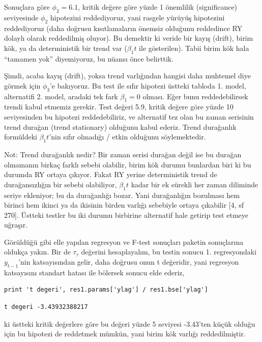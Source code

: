 \documentclass[12pt,fleqn]{article}\usepackage{../../common}
\begin{document}
Sonuçlara göre $\phi_2 = 6.1$, kritik değere göre yüzde 1 önemlilik
(significance) seviyesinde $\phi_2$ hipotezini reddediyoruz, yani rasgele
yürüyüş hipotezini reddediyoruz (daha doğrusu kısıtlamaların önemsiz
olduğunu reddedince RY dolaylı olarak reddedilmiş oluyor). Bu demektir ki
veride bir kayış (drift), birim kök, ya da deterministik bir trend var
($\beta_1 t$ ile gösterilen). Tabii birim kök hala ``tamamen yok'' diyemiyoruz,
bu nüansı önce belirttik.

Şimdi, acaba kayış (drift), yoksa trend varlığından hangisi daha muhtemel
diye görmek için $\phi_3$'e bakıyoruz. Bu test ile sıfır hipotezi üstteki
tabloda 1. model, alternatifi 2. model, aradaki tek fark $\beta_1=0$
olması. Eğer bunu reddedebilirsek trendi kabul etmemiz gerekir. Test değeri
5.9, kritik değere göre yüzde 10 seviyesinden bu hipotezi reddedebiliriz,
ve alternatif tez olan bu zaman serisinin trend durağan (trend stationary)
olduğunu kabul ederiz. Trend durağanlık formüldeki $\beta_1 t$'nin sıfır
olmadığı / etkin olduğunu söylemektedir.

Not: Trend durağanlık nedir? Bir zaman serisi durağan değil ise bu durağan
olmamanın birkaç farklı sebebi olabilir, birim kök durumu bunlardan biri ki bu
durumda RY ortaya çıkıyor. Fakat RY yerine deterministik trend de
durağansızlığın bir sebebi olabiliyor, $\beta_1 t$ kadar bir ek sürekli her
zaman diliminde seriye ekleniyor; bu da durağanlığı bozar. Yani durağanlığın
bozulması hem birinci hem ikinci ya da ikisinin birden varlığı sebebiyle ortaya
çıkabilir [4, sf 270]. Üstteki testler bu iki durumu birbirine alternatif hale
getirip test etmeye uğraşır.

Görüldüğü gibi elle yapılan regresyon ve F-test sonuçları paketin
sonuçlarına oldukça yakın. Bir de $\tau_\tau$ değerini hesaplayalım, bu
testin sonucu 1. regresyondaki $y_{t-1}$'nin katsayısından gelir, daha
doğrusu onun t değeridir, yani regresyon katsayısını standart hatası ile
bölersek sonucu elde ederiz,

\begin{verbatim}
print 't degeri', res1.params['ylag'] / res1.bse['ylag']
\end{verbatim}

\begin{verbatim}
t degeri -3.43932388217
\end{verbatim}

ki üstteki kritik değerlere göre bu değeri yüzde 5 seviyesi -3.43'ten küçük
olduğu için bu hipotezi de reddetmek mümkün, yani birim kök varlığı
reddedilmiştir.
\end{document}
